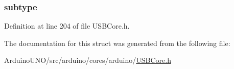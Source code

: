\hypertarget{struct_c_d_c_c_s_interface_descriptor_afb82dd1313bc5284e4e5aef8218ef414}{}
\subsubsection[{subtype}]{ subtype}\label{struct_c_d_c_c_s_interface_descriptor_afb82dd1313bc5284e4e5aef8218ef414}


Definition at line 204 of file U\+S\+B\+Core.\+h.



The documentation for this struct was generated from the following file\+:\begin{DoxyCompactItemize}
\item 
Arduino\+U\+N\+O/src/arduino/cores/arduino/\hyperlink{_u_s_b_core_8h}{U\+S\+B\+Core.\+h}\end{DoxyCompactItemize}
